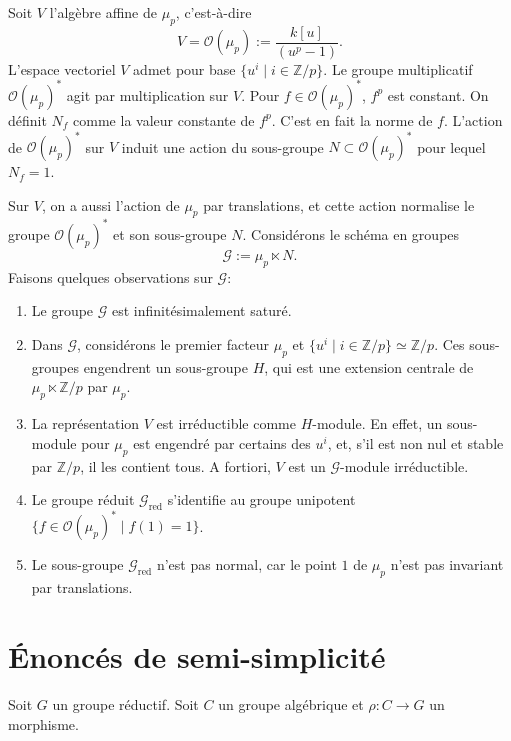 \documentclass[11pt]{article}
\newcommand{\red}{\mathrm{red}}
\begin{document}
Soit \(V\) l'algèbre affine de \(\mu_p\), c'est-à-dire
\begin{equation}
  V=\mathcal O(\mu_p):=\frac{k[u]}{(u^p-1)}.
  \tag{3.7.1}
\end{equation}
L'espace vectoriel \(V\) admet pour base \(\{u^i\mid i\in\mathbb Z/p\}\). Le groupe
multiplicatif \(\mathcal O(\mu_p)^*\) agit par multiplication sur \(V\). Pour
\(f\in\mathcal O(\mu_p)^*\), \(f^p\) est constant. On définit \(N_f\) comme la valeur
constante de \(f^p\). C'est en fait la norme de \(f\). L'action de
\(\mathcal O(\mu_p)^*\) sur \(V\) induit une action du sous-groupe
\(N\subset\mathcal O(\mu_p)^*\) pour lequel \(N_f=1\).

Sur \(V\), on a aussi l'action de \(\mu_p\) par translations, et cette action normalise
le groupe \(\mathcal O(\mu_p)^*\) et son sous-groupe \(N\). Considérons le schéma en
groupes
\begin{equation}
  \mathcal G:=\mu_p\ltimes N.
  \tag{3.7.2}
\end{equation}
Faisons quelques observations sur \(\mathcal G\):
\begin{enumerate}[label=(\arabic*),leftmargin=2em]
\item Le groupe \(\mathcal G\) est infinitésimalement saturé.
\item Dans \(\mathcal G\), considérons le premier facteur \(\mu_p\) et
\(\{u^i\mid i\in\mathbb Z/p\}\simeq\mathbb Z/p\). Ces sous-groupes engendrent un
sous-groupe \(H\), qui est une extension centrale de \(\mu_p\ltimes\mathbb Z/p\) par
\(\mu_p\).
\item La représentation \(V\) est irréductible comme \(H\)-module. En effet, un
sous-module pour \(\mu_p\) est engendré par certains des \(u^i\), et, s'il est non nul
et stable par \(\mathbb Z/p\), il les contient tous. A fortiori, \(V\) est un
\(\mathcal G\)-module irréductible.
\item Le groupe réduit \(\mathcal G_{\red}\) s'identifie au groupe unipotent
\(\{f\in\mathcal O(\mu_p)^*\mid f(1)=1\}\).
\item Le sous-groupe \(\mathcal G_{\red}\) n'est pas normal, car le point \(1\) de
\(\mu_p\) n'est pas invariant par translations.
\end{enumerate}

\section{Énoncés de semi-simplicité}

Soit \(G\) un groupe réductif. Soit \(C\) un groupe algébrique et
\(\rho:C\to G\) un morphisme.
\end{document}
